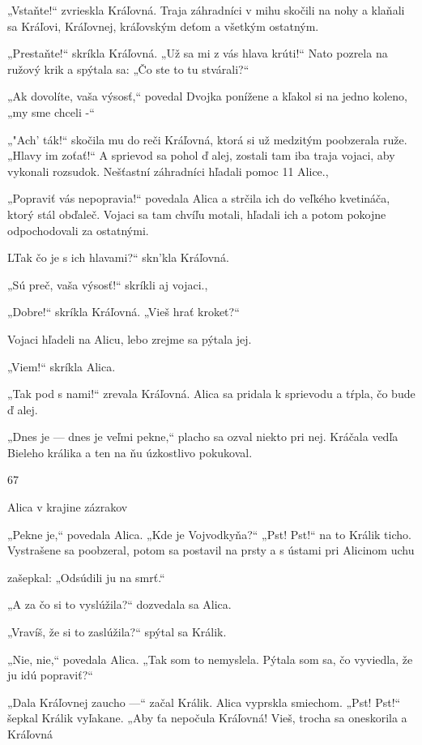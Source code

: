 \documentclass[12pt]{article}
\begin{document}
\begin{Parallel}[p]{}{}
{{„Vstaňte!“ zvrieskla Kráľovná. Traja záhradníci v mihu
skočili na nohy a klaňali sa Kráľovi, Kráľovnej, kráľovským
deťom a všetkým ostatným.

„Prestaňte!“ skríkla Kráľovná. „Už sa mi z vás hlava
krúti!“ Nato pozrela na ružový krik a spýtala sa: „Čo ste to
tu stvárali?“

„Ak dovolíte, vaša výsosť,“ povedal Dvojka ponížene
a kľakol si na jedno koleno, „my sme chceli -“

„"Ach' ták!“ skočila mu do reči Kráľovná, ktorá si už
medzitým poobzerala ruže. „Hlavy im zoťať!“ A sprievod sa
pohol ď alej, zostali tam iba traja vojaci, aby vykonali
rozsudok. Nešťastní záhradníci hľadali pomoc 11 Alice.,

„Popraviť vás nepopravia!“ povedala Alica a strčila ich do
veľkého kvetináča, ktorý stál obďaleč. Vojaci sa tam chvíľu
motali, hľadali ich a potom pokojne odpochodovali za
ostatnými.

LTak čo je s ich hlavami?“ skn'kla Kráľovná.

„Sú preč, vaša výsosť!“ skríkli aj vojaci.,

„Dobre!“ skríkla Kráľovná. „Vieš hrať kroket?“

Vojaci hľadeli na Alicu, lebo zrejme sa pýtala jej.

„Viem!“ skríkla Alica.

„Tak pod s nami!“ zrevala Kráľovná. Alica sa pridala
k sprievodu a tŕpla, čo bude ď alej.

„Dnes je — dnes je veľmi pekne,“ placho sa ozval niekto
pri nej. Kráčala vedľa Bieleho králika a ten na ňu úzkostlivo
pokukoval.

67

Alica v krajine zázrakov

„Pekne je,“ povedala Alica. „Kde je Vojvodkyňa?“
„Pst! Pst!“ na to Králik ticho. Vystrašene sa poobzeral,
potom sa postavil na prsty a s ústami pri Alicinom uchu

zašepkal: „Odsúdili ju na smrť.“

„A za čo si to vyslúžila?“ dozvedala sa Alica.

„Vravíš, že si to zaslúžila?“ spýtal sa Králik.

„Nie, nie,“ povedala Alica. „Tak som to nemyslela.
Pýtala som sa, čo vyviedla, že ju idú popraviť?“

„Dala Kráľovnej zaucho —“ začal Králik. Alica vyprskla
smiechom. „Pst! Pst!“ šepkal Králik vyľakane. „Aby ťa
nepočula Kráľovná! Vieš, trocha sa oneskorila a Kráľovná

}}
\end{Parallel}
\end{document}

